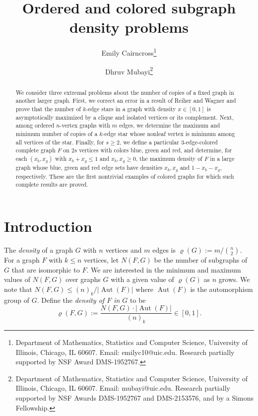 \documentclass[11pt]{article}
\newcommand{\aut}{{\operatorname{Aut}}}
\theoremstyle{definition}
\begin{document}
 
\title{Ordered and colored subgraph density problems}
\author{Emily Cairncross\thanks{Department of Mathematics, Statistics and Computer Science, University of Illinois, Chicago, IL 60607. Email: emilyc10@uic.edu. Research partially supported by NSF Award
DMS-1952767.} \and Dhruv Mubayi\thanks{Department of Mathematics, Statistics and Computer Science, University of Illinois, Chicago, IL 60607. Email: mubayi@uic.edu. Research partially supported by NSF Awards 
DMS-1952767 and DMS-2153576, and by a Simons Fellowship.} }

\maketitle

\begin{abstract}
    We consider three extremal problems about the number of copies of a fixed graph in another larger graph. First, we correct an error in a result of  Reiher and Wagner \cite{RW} and prove that the number of $k$-edge stars  in a graph with  density $x \in [0, 1]$ is asymptotically maximized by a clique and isolated vertices or its complement. Next,  among   ordered $n$-vertex graphs with $m$ edges, we  determine the maximum and minimum number of copies of a $k$-edge star whose nonleaf vertex is minimum among all vertices of the star. Finally, for $s \ge 2$, we define a particular  3-edge-colored complete graph $F$ on $2s$ vertices with colors blue, green and red, and  determine, for each $(x_b, x_g)$ with $x_b+x_g\le 1$ and $x_b, x_g \ge 0$,   the maximum density of $F$ in a large graph whose blue, green and red  edge sets have densities $x_b, x_g$ and $1-x_b-x_g$, respectively. These are the first nontrivial examples of colored graphs for which such complete results are proved.
\end{abstract}

\section{Introduction}

The {\em density} of a graph $G$  with $n$ vertices and $m$ edges is
$\varrho(G):=m / \binom{n}{2}$. For a graph $F$ with $k \leq n$ vertices, let $N(F, G)$ be the number of subgraphs of $G$ that are isomorphic to $F$. We are interested in the minimum and maximum values of $N(F, G)$ over graphs $G$ with a given value of $\varrho(G)$ as $n$ grows. We note that $N(F, G) \le (n)_k/|\aut(F)|$ where $\aut(F)$ is the automorphism group of $G$. 
Define the {\em density of $F$ in $G$} to be \[ \varrho (F, G) := \frac{N(F, G) \cdot |\aut (F)| }{ (n)_k}  \in [0,1]. \]
\end{document}
